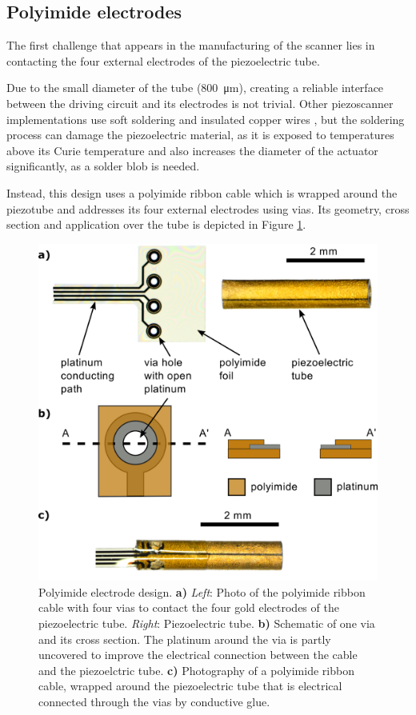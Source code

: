 \documentclass[10pt]{iopart}
\begin{document}
\subsection{Polyimide electrodes}

The first challenge that appears in the manufacturing of the scanner lies in contacting the four external electrodes of the piezoelectric tube. 

Due to the small diameter of the tube (\SI{800}{\micro\meter}), creating a reliable interface between the driving circuit and its electrodes is not trivial. Other piezoscanner implementations use soft soldering and insulated copper wires \cite{Lee2010, Meinert, Huo2010}, but the soldering process can damage the piezoelectric material, as it is exposed to temperatures above its Curie temperature and also increases the diameter of the actuator significantly, as a solder blob is needed. %

Instead, this design uses a polyimide ribbon cable which is wrapped around the piezotube and addresses its four external electrodes using vias. Its geometry, cross section and application over the tube is depicted in Figure \ref{fig:piRolled}.

\begin{figure}[h!]\centering \includegraphics[width=\columnwidth]{figures/tubeFoil.png}
      \caption{Polyimide electrode design.
      \textbf{a)} \textit{Left}: Photo of the polyimide ribbon cable with four vias to contact the four gold electrodes of the piezoelectric tube. \textit{Right}: Piezoelectric tube.
      \textbf{b)} Schematic of one via and its cross section. The platinum around the via is partly uncovered to improve the electrical connection between the cable and the piezoelctric tube.
      \textbf{c)} Photography of a polyimide ribbon cable, wrapped around the piezoelectric tube that is electrical connected through the vias by conductive glue.}
      \label{fig:piRolled}
\end{figure}
\end{document}

